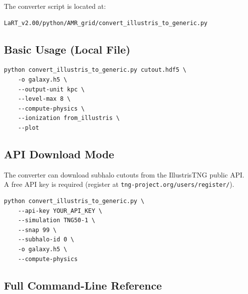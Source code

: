 \documentclass[english,a4paper]{my_memo}
\begin{document}
The converter script is located at:
\begin{lstlisting}[style=shellstyle]
LaRT_v2.00/python/AMR_grid/convert_illustris_to_generic.py
\end{lstlisting}

\subsection{Basic Usage (Local File)}

\begin{lstlisting}[style=shellstyle]
python convert_illustris_to_generic.py cutout.hdf5 \
    -o galaxy.h5 \
    --output-unit kpc \
    --level-max 8 \
    --compute-physics \
    --ionization from_illustris \
    --plot
\end{lstlisting}

\subsection{API Download Mode}

The converter can download subhalo cutouts from the IllustrisTNG
public API.  A free API key is required (register at
\texttt{tng-project.org/users/register/}).

\begin{lstlisting}[style=shellstyle]
python convert_illustris_to_generic.py \
    --api-key YOUR_API_KEY \
    --simulation TNG50-1 \
    --snap 99 \
    --subhalo-id 0 \
    -o galaxy.h5 \
    --compute-physics
\end{lstlisting}

\subsection{Full Command-Line Reference}
\end{document}

